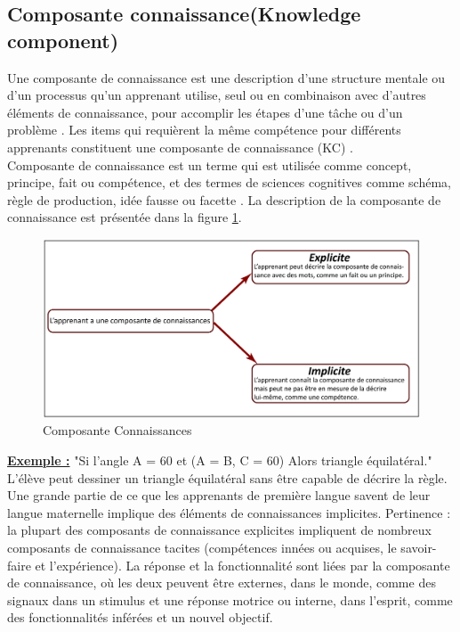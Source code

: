 \subsection{Composante connaissance(Knowledge component)}
Une composante de connaissance est une description d’une structure mentale ou d’un processus qu’un apprenant utilise, seul ou en combinaison avec d’autres éléments de connaissance, pour accomplir les étapes d’une tâche ou d’un problème \cite{koedinger2012knowledge}. Les items qui requièrent la même compétence pour différents apprenants constituent une composante de connaissance (KC) \cite{nazaretsky2018kappa}. \\
Composante de connaissance est un terme qui est utilisée comme concept, principe, fait ou compétence, et des termes de sciences cognitives comme schéma, règle de production, idée fausse ou facette \cite{vanlehn2006behavior}. 
La description de la composante de connaissance est présentée dans la figure \ref{knowledge_component}.

\begin{figure}[H]
	\begin{center}
		\includegraphics[width=\textwidth]{images/chapitre3/Knowledge_component.png}
	\end{center}
\caption{Composante Connaissances}
\label{knowledge_component}
\end{figure}
\textbf{\underline{Exemple :}}
"Si l'angle A = 60 et (A = B, C = 60) Alors triangle équilatéral." \\
L'élève peut dessiner un triangle équilatéral sans être capable de décrire la règle. Une grande partie de ce que les apprenants de première langue savent de leur langue maternelle implique des éléments de connaissances implicites. Pertinence : la plupart des composants de connaissance explicites impliquent de nombreux composants de connaissance tacites (compétences innées ou acquises, le savoir-faire et l'expérience). La réponse et la fonctionnalité sont liées par la composante de connaissance, où les deux peuvent être externes, dans le monde, comme des signaux dans un stimulus et une réponse motrice ou interne, dans l'esprit, comme des fonctionnalités inférées et un nouvel objectif\cite{vanlehn2006behavior}.


